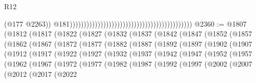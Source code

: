\begin{lexlean}{R12}
\begin{coremodule}
                                                                                              (@177
                                                                                                @2263))
                                                                                            @181))))))))))))))))))))))))))))))))))))))))))))
@2360 := @1807
    (@1812
      (@1817
        (@1822
          (@1827
            (@1832
              (@1837
                (@1842
                  (@1847
                    (@1852
                      (@1857
                        (@1862
                          (@1867
                            (@1872
                              (@1877
                                (@1882
                                  (@1887
                                    (@1892
                                      (@1897
                                        (@1902
                                          (@1907
                                            (@1912
                                              (@1917
                                                (@1922
                                                  (@1927
                                                    (@1932
                                                      (@1937
                                                        (@1942
                                                          (@1947
                                                            (@1952
                                                              (@1957
                                                                (@1962
                                                                  (@1967
                                                                    (@1972
                                                                      (@1977
                                                                        (@1982
                                                                          (@1987
                                                                            (@1992
                                                                              (@1997
                                                                                (@2002
                                                                                  (@2007
                                                                                    (@2012
                                                                                      (@2017
                                                                                        (@2022

\end{coremodule}
\end{lexlean}
